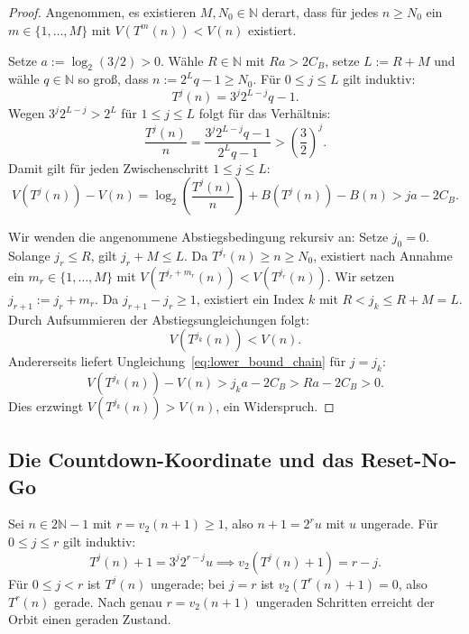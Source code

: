 \documentclass[11pt,reqno]{amsart}
\theoremstyle{definition}
\theoremstyle{remark}
\numberwithin{equation}{section}
\begin{document}
\begin{proof}
Angenommen, es existieren $M, N_0 \in \mathbb{N}$ derart, dass f\"ur jedes $n \ge N_0$ ein $m \in \{1, \dots, M\}$ mit $V(T^m(n)) < V(n)$ existiert.

Setze $a := \log_2(3/2) > 0$. W\"ahle $R \in \mathbb{N}$ mit $Ra > 2C_B$, setze $L := R + M$ und w\"ahle $q \in \mathbb{N}$ so gro\ss{}, dass $n := 2^L q - 1 \ge N_0$.
F\"ur $0 \le j \le L$ gilt induktiv:
\begin{equation}
T^j(n) = 3^j 2^{L-j} q - 1.
\end{equation}
Wegen $3^j 2^{L-j} > 2^L$ f\"ur $1 \le j \le L$ folgt f\"ur das Verh\"altnis:
\begin{equation}
\frac{T^j(n)}{n} = \frac{3^j 2^{L-j} q - 1}{2^L q - 1} > \left(\frac{3}{2}\right)^j.
\end{equation}
Damit gilt f\"ur jeden Zwischenschritt $1 \le j \le L$:
\begin{equation}
V(T^j(n)) - V(n) = \log_2\left(\frac{T^j(n)}{n}\right) + B(T^j(n)) - B(n) > j a - 2C_B.
\label{eq:lower_bound_chain}
\end{equation}

Wir wenden die angenommene Abstiegsbedingung rekursiv an:
Setze $j_0 = 0$. Solange $j_r \le R$, gilt $j_r + M \le L$. Da $T^{j_r}(n) \ge n \ge N_0$, existiert nach Annahme ein $m_r \in \{1, \dots, M\}$ mit $V(T^{j_r + m_r}(n)) < V(T^{j_r}(n))$.
Wir setzen $j_{r+1} := j_r + m_r$. Da $j_{r+1} - j_r \ge 1$, existiert ein Index $k$ mit $R < j_k \le R + M = L$. 
Durch Aufsummieren der Abstiegsungleichungen folgt:
\begin{equation}
V(T^{j_k}(n)) < V(n).
\end{equation}
Andererseits liefert Ungleichung~\eqref{eq:lower_bound_chain} f\"ur $j = j_k$:
\begin{equation}
V(T^{j_k}(n)) - V(n) > j_k a - 2C_B > R a - 2C_B > 0.
\end{equation}
Dies erzwingt $V(T^{j_k}(n)) > V(n)$, ein Widerspruch.
\end{proof}

\subsection{Die Countdown-Koordinate und das Reset-No-Go}

Sei $n \in 2\mathbb{N}-1$ mit $r = v_2(n+1) \ge 1$, also $n + 1 = 2^r u$ mit $u$ ungerade. F\"ur $0 \le j \le r$ gilt induktiv:
\begin{equation}
T^j(n) + 1 = 3^j 2^{r-j} u \implies v_2(T^j(n) + 1) = r - j.
\end{equation}
F\"ur $0 \le j < r$ ist $T^j(n)$ ungerade; bei $j = r$ ist $v_2(T^r(n)+1) = 0$, also $T^r(n)$ gerade.
Nach genau $r = v_2(n+1)$ ungeraden Schritten erreicht der Orbit einen geraden Zustand.
\end{document}
